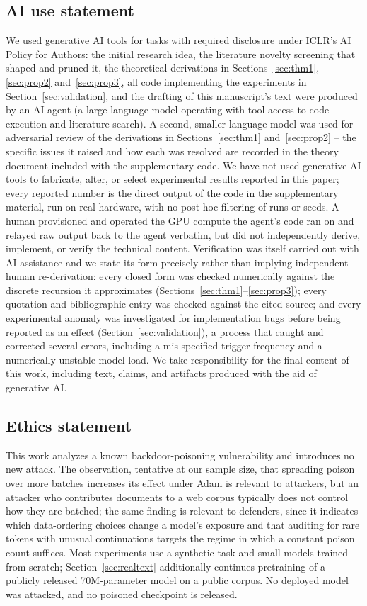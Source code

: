 \documentclass{article} %
\begin{document}
\subsection*{AI use statement}
We used generative AI tools for tasks with required disclosure under ICLR's AI Policy
for Authors: the initial research idea, the literature novelty screening that shaped
and pruned it, the theoretical derivations in Sections~\ref{sec:thm1},
\ref{sec:prop2} and~\ref{sec:prop3}, all code implementing the experiments in
Section~\ref{sec:validation}, and the drafting of this manuscript's text were produced
by an AI agent (a large language model operating with tool access to code execution
and literature search). A second, smaller language model was used for adversarial
review of the derivations in Sections~\ref{sec:thm1} and~\ref{sec:prop2} -- the specific issues it raised and how each was resolved are
recorded in the theory document included with the supplementary code. We have not used generative AI tools to fabricate, alter, or select
experimental results reported in this paper; every reported number is the direct
output of the code in the supplementary material, run on real hardware, with no
post-hoc filtering of runs or seeds. A human provisioned and operated the GPU compute
the agent's code ran on and relayed raw output back to the agent verbatim, but did not
independently derive, implement, or verify the technical content. Verification was itself carried out with AI
assistance and we state its form precisely rather than implying independent human
re-derivation: every closed form was checked numerically against the discrete recursion
it approximates (Sections~\ref{sec:thm1}--\ref{sec:prop3}); every quotation and
bibliographic entry was checked against the cited source; and every experimental anomaly
was investigated for implementation bugs before being reported as an effect
(Section~\ref{sec:validation}), a process that caught and corrected several errors,
including a mis-specified trigger frequency and a numerically unstable model load. We take
responsibility for the final content of this work, including text, claims, and
artifacts produced with the aid of generative AI.

\subsection*{Ethics statement}
This work analyzes a known backdoor-poisoning vulnerability and introduces no new
attack. The observation, tentative at our sample size, that spreading poison over more batches increases its effect under Adam is relevant to attackers, but an attacker who contributes documents to a web
corpus typically does not control how they are batched; the same finding is relevant to
defenders, since it indicates which data-ordering choices change a model's exposure
and that auditing for rare tokens with unusual continuations targets the regime in
which a constant poison count suffices. Most experiments use a synthetic task and small models
trained from scratch; Section~\ref{sec:realtext} additionally continues pretraining of
a publicly released 70M-parameter model on a public corpus. No deployed model was
attacked, and no poisoned checkpoint is released.
\end{document}
